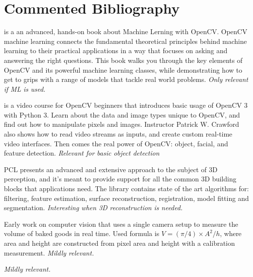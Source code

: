 \clearpage
\chapter*{Commented Bibliography}

\newcommand{\parstartcite}[1]{\textbf{\citeauthor{#1}} \textsf{\citetitle{#1}} \autocite{#1} \newline}

\parstartcite{beyeler2017opencvml} is a an advanced, hands-on book about Machine Lerning with OpenCV.
OpenCV machine learning connects the fundamental theoretical principles
behind machine learning to their practical applications in a way that focuses
on asking and answering the right questions.
This book walks you through the key elements of OpenCV
and its powerful machine learning classes,
while demonstrating how to get to grips with a range of models that tackle real world problems.
\emph{Only relevant if ML is used.}


\parstartcite{crawford2017opencvpythonvideo} is a video course for OpenCV beginners that introduces basic usage of OpenCV 3 with Python 3. 
Learn about the data and image types unique to OpenCV, and find out how to
manipulate pixels and images. Instructor Patrick W. Crawford also shows how
to read video streams as inputs, and create custom real-time video interfaces.
Then comes the real power of OpenCV: object, facial, and feature detection.
\emph{Relevant for basic object detection}


\parstartcite{rusu2011pointcloud}
PCL presents an advanced
and extensive approach to the subject of 3D perception, and
it’s meant to provide support for all the common 3D building
blocks that applications need. The library contains state of the
art algorithms for: filtering, feature estimation, surface
reconstruction, registration, model fitting and segmentation.
\emph{Interesting when 3D reconstruction is needed.}

\parstartcite{levine1989microwave}
Early work on computer vision that uses a single camera setup to measure the volume of baked goods in real time. Used formula is $V = (\pi/4) \times A^2/h$, where area and height are constructed from pixel area and height with a calibration measurement.
\emph{Mildly relevant.}

\parstartcite{wang2017apple}
\emph{Mildly relevant.}

\parstartcite{hildebrand1997thickness}

